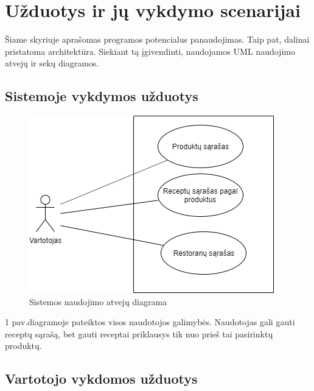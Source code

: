 \documentclass{VUMIFInfKursinis}
\begin{document}
\section{Užduotys ir jų vykdymo scenarijai}
Šiame skyriuje aprašomas programos potencialus panaudojimas. Taip pat, dalinai pristatoma architektūra. Siekiant tą įgivendinti, naudojamos UML naudojimo atvejų ir sekų diagramos.
\subsection{Sistemoje vykdymos užduotys}
\begin{figure}[H]
    \centering
 \includegraphics[scale=0.6]{img/uc}
    \caption{Sistemos naudojimo atvejų diagrama}   %
    \label{img:mlp}
\end{figure}
\bigskip
1 pav.diagramoje pateiktos visos naudotojos galimybės. Naudotojas gali gauti receptų sąrašą, bet gauti receptai priklausys tik nuo prieš tai pasirinktų produktų.

\subsection{Vartotojo vykdomos  užduotys}
\end{document}
